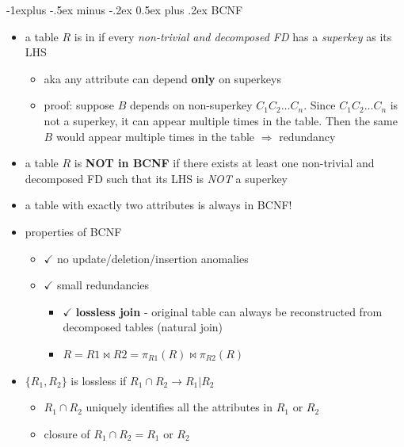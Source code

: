 \documentclass[10pt, landscape]{article}
\makeatletter
\renewcommand{\subsection}{\@startsection{subsection}{2}{0mm}%
  {-1explus -.5ex minus -.2ex}%
  {0.5ex plus .2ex}%
{\normalfont\normalsize\bfseries}}
\makeatother
\begin{document}
\begin{multicols}{3}
  \subsection{BCNF}
  \begin{itemize}
    \item a table $R$ is in  if every \textit{non-trivial and decomposed FD} has a \textit{superkey} as its LHS
      \begin{itemize}
        \item aka any attribute can depend \textbf{only} on superkeys
        \item proof: suppose $B$ depends on non-superkey $C_1 C_2 \dots C_n$. Since $C_1 C_2 \dots C_n$ is not a superkey, it can appear multiple times in the table. Then the same  $B$ would appear multiple times in the table $\Rightarrow$ redundancy
      \end{itemize}
    \item a table $R$ is \textbf{NOT in BCNF} if there exists at least one non-trivial and decomposed FD such that its LHS is \textit{NOT} a superkey
    \item a table with exactly two attributes is always in BCNF!
    \item properties of BCNF
      \begin{itemize}
        \item $\checkmark$ no update/deletion/insertion anomalies
        \item $\checkmark$ small redundancies
          \begin{itemize}
            \item $\checkmark$ \textbf{lossless join} - original table can always be reconstructed from decomposed tables (natural join)
            \item $R = R1 \Join R2 = \pi_{R1}(R) \Join \pi_{R2}(R)$
          \end{itemize}
      \end{itemize}
    \item {} $\{R_1, R_2\}$ is lossless if $R_1 \cap R_2 \rightarrow R_1 \vert R_2$ 
      \begin{itemize}
        \item $R_1 \cap R_2$ uniquely identifies all the attributes in $R_1$ or $R_2$
          \item closure of $R_1 \cap R_2 = R_1$ or $R_2$ 
      \end{itemize}
  \end{itemize}


\end{multicols}
\end{document}
